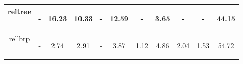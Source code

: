 \documentclass{article}
\begin{document}
\begin{table}[H]
\begin{center}
\begin{tabular}{|c|c|c|c|c|c|c|c|c|c|c|}
				    reltree & \begin{footnotesize}-\end{footnotesize} & \begin{footnotesize}16.23\end{footnotesize} & \begin{footnotesize}10.33\end{footnotesize} & \begin{footnotesize}-\end{footnotesize} & \begin{footnotesize}12.59\end{footnotesize} & \begin{footnotesize}-\end{footnotesize} & \begin{footnotesize}3.65\end{footnotesize} & \begin{footnotesize}-\end{footnotesize} & \begin{footnotesize}-\end{footnotesize} & \begin{footnotesize}44.15\end{footnotesize}\\ \hline
   				    rellbrp & \begin{footnotesize}-\end{footnotesize} & \begin{footnotesize}2.74\end{footnotesize} & \begin{footnotesize}2.91\end{footnotesize} & \begin{footnotesize}-\end{footnotesize} & \begin{footnotesize}3.87\end{footnotesize} & \begin{footnotesize}1.12\end{footnotesize} & \begin{footnotesize}4.86\end{footnotesize} & \begin{footnotesize}2.04\end{footnotesize} & \begin{footnotesize}1.53\end{footnotesize} & \begin{footnotesize}54.72\end{footnotesize}\\ \hline

\end{tabular}
\end{center}
\end{table}
\end{document}

